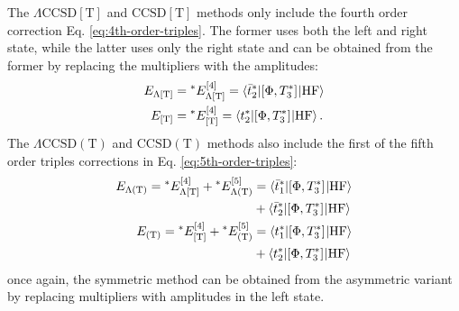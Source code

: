 The $\Lambda\text{CCSD}[\text{T}]$\autocite{Eriksen2015-il} and
$\text{CCSD}[\text{T}]$\autocite{Urban1985-xp} methods only include the
fourth order correction Eq. \eqref{eq:4th-order-triples}.
The former uses both the left and right state, while the latter uses
only the right state and can be obtained from the former by replacing
the multipliers with the amplitudes:\autocite{Koch1997-nm,
Eriksen2015-il}
\begin{subequations}\label{eq:brackets-t}
  \begin{align}
    E_{\Lambda\text{[T]}} &= {}^* E^{[4]}_{\Lambda\text{[T]}} =
    \braket{\bar{t}_{2}^{*}| [ \Phi, T_3^{*} ]^{} | \mathrm{HF}} \\
    E_{\text{[T]}} &= {}^* E^{[4]}_{\text{[T]}} = \braket{t_{2}^{*}|
    [ \Phi, T_3^{*} ]^{} | \mathrm{HF}}.
  \end{align}
\end{subequations}
The $\Lambda\text{CCSD}(\text{T})$\autocite{Kucharski1998-qq,
Kucharski1998-oi, Crawford1998-vj} and
$\text{CCSD}(\text{T})$\autocite{Raghavachari1989-bn} methods also
include the first of the fifth order triples corrections in Eq.
\eqref{eq:5th-order-triples}:
\begin{subequations}\label{eq:parentheses-t}
 \begin{align}
  E_{\Lambda(\text{T})} = {}^* E^{[4]}_{\Lambda\text{[T]}} + {}^* E^{[5]}_{\Lambda\text{(T)}}
  &=
    \braket{\bar{t}_{1}^{*} | [ \Phi, T_3^{*} ]^{} | \mathrm{HF}} \\
    &+
    \braket{\bar{t}_{2}^{*}| [ \Phi, T_3^{*} ]^{} | \mathrm{HF}}
    \\
  E_{(\text{T})} = {}^* E^{[4]}_{\text{[T]}} + {}^* E^{[5]}_{\text{(T)}}
  &=
    \braket{t_{1}^{*} | [ \Phi, T_3^{*} ]^{} | \mathrm{HF}} \\
    &+
    \braket{t_{2}^{*}| [ \Phi, T_3^{*} ]^{} | \mathrm{HF}}
 \end{align}
\end{subequations}
once again, the symmetric method can be obtained from the asymmetric
variant by replacing multipliers with amplitudes in the left state.

